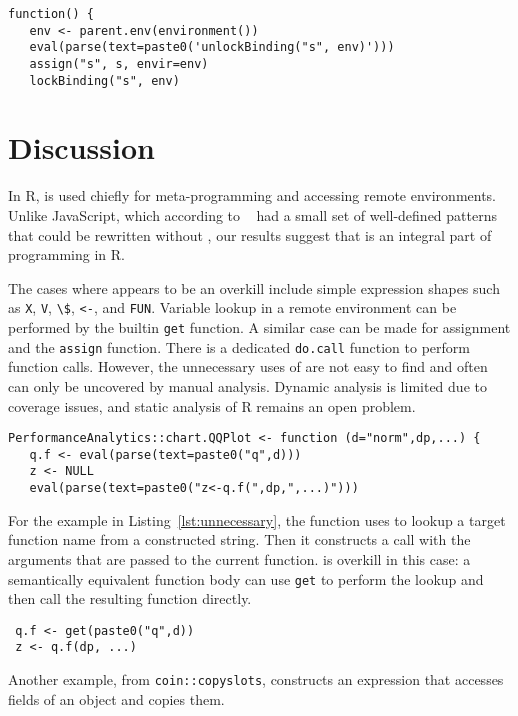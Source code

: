 \documentclass[acmsmall, screen]{acmart}
\renewcommand{\k}[1]{\lstinline |#1|\xspace}
\begin{document}
\begin{lstlisting}[caption={\k{aibd::scalaEnsure}}, captionpos=b]
 function() {
   env <- parent.env(environment())
   eval(parse(text=paste0('unlockBinding("s", env)')))
   assign("s", s, envir=env)
   lockBinding("s", env)
\end{lstlisting}\medskip

\section{Discussion}


In R, \eval is used chiefly for meta-programming and accessing remote
environments. Unlike JavaScript, which according to ~\citet{ecoop11} had a small
set of well-defined patterns that could be rewritten without \eval, our results
suggest that \eval is an integral part of programming in R.

The cases where \eval appears to be an overkill include simple expression shapes
such as \k{X}, \k{V}, \k{\$}, \k{<-}, and \k{FUN}. Variable lookup in a remote
environment can be performed by the builtin \k{get} function. A similar case can
be made for assignment and the \k{assign} function. There is a dedicated
\k{do.call} function to perform function calls. However, the unnecessary uses of
\eval are not easy to find and often can only be uncovered by manual analysis.
Dynamic analysis is limited due to coverage issues, and static analysis of R
remains an open problem.


\begin{lstlisting}[caption={Unnecessary use of \eval},label=lst:unnecessary]
 PerformanceAnalytics::chart.QQPlot <- function (d="norm",dp,...) {
   q.f <- eval(parse(text=paste0("q",d)))
   z <- NULL
   eval(parse(text=paste0("z<-q.f(",dp,",...)")))
\end{lstlisting}\medskip

For the example in Listing~\ref{lst:unnecessary}, the function uses \eval to
lookup a target function name from a constructed string. Then it constructs a
call with the arguments that are passed to the current function. \Eval is
overkill in this case: a semantically equivalent function body can use \k{get}
to perform the lookup and then call the resulting function directly.

\begin{lstlisting}
 q.f <- get(paste0("q",d))
 z <- q.f(dp, ...)
\end{lstlisting}

Another example, from \k{coin::copyslots}, constructs an expression that accesses
fields of an object and copies them.
\end{document}
